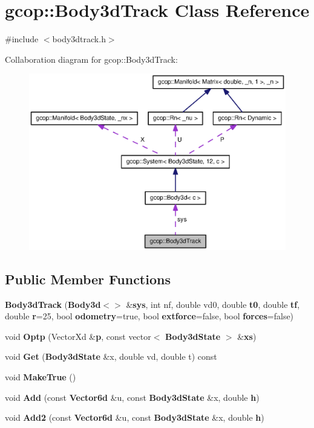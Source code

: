 \section{gcop\-:\-:\-Body3d\-Track \-Class \-Reference}
\label{classgcop_1_1Body3dTrack}


{\ttfamily \#include $<$body3dtrack.\-h$>$}



\-Collaboration diagram for gcop\-:\-:\-Body3d\-Track\-:\nopagebreak
\begin{figure}[H]
\begin{center}
\leavevmode
\includegraphics[width=350pt]{classgcop_1_1Body3dTrack__coll__graph}
\end{center}
\end{figure}
\subsection*{\-Public \-Member \-Functions}
\begin{DoxyCompactItemize}
\item 
{\bf \-Body3d\-Track} ({\bf \-Body3d}$<$$>$ \&{\bf sys}, int nf, double vd0, double {\bf t0}, double {\bf tf}, double {\bf r}=25, bool {\bf odometry}=true, bool {\bf extforce}=false, bool {\bf forces}=false)
\item 
void {\bf \-Optp} (\-Vector\-Xd \&{\bf p}, const vector$<$ {\bf \-Body3d\-State} $>$ \&{\bf xs})
\item 
void {\bf \-Get} ({\bf \-Body3d\-State} \&x, double vd, double t) const 
\item 
void {\bf \-Make\-True} ()
\item 
void {\bf \-Add} (const {\bf \-Vector6d} \&u, const {\bf \-Body3d\-State} \&x, double {\bf h})
\item 
void {\bf \-Add2} (const {\bf \-Vector6d} \&u, const {\bf \-Body3d\-State} \&x, double {\bf h})
\end{DoxyCompactItemize}
